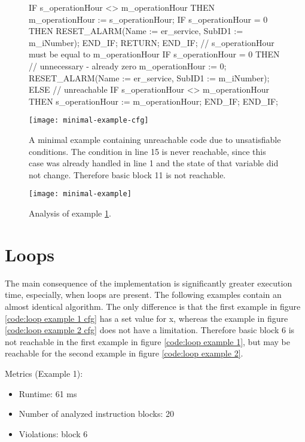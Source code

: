 \begin{figure}
	\begin{GenericCode}
IF s_operationHour <> m_operationHour THEN
	m_operationHour := s_operationHour;
	IF s_operationHour = 0 THEN
		RESET_ALARM(Name := er_service, SubID1 := m_iNumber);
	END_IF;
	RETURN;
END_IF;
// s_operationHour must be equal to m_operationHour
IF s_operationHour = 0 THEN
	// unnecessary - already zero
	m_operationHour := 0;
	RESET_ALARM(Name := er_service, SubID1 := m_iNumber);
ELSE
	// unreachable
	IF s_operationHour <> m_operationHour THEN
		s_operationHour := m_operationHour;
	END_IF;
END_IF;	\end{GenericCode}
	\centering

	\texttt{[image: minimal-example-cfg]}
	\caption{A minimal example containing unreachable code due to unsatisfiable conditions. The condition in line 15 is never reachable, since this case was already handled in line 1 and the state of that variable did not change. Therefore basic block 11 is not reachable.}
	\label{code:basic example 1 cfg}
\end{figure}

\begin{figure}
	\centering
	\texttt{[image: minimal-example]}
	\caption{Analysis of example \ref{code:basic example 1 cfg}. }
	\label{code:basic example 1}
\end{figure}

\section{Loops}
The main consequence of the implementation is significantly greater execution time, especially, when loops are present.
The following examples contain an almost identical algorithm. The only difference is that the first example in figure \ref{code:loop example 1 cfg} has a set value for x, whereas the example in figure \ref{code:loop example 2 cfg} does not have a limitation. Therefore basic block 6 is not reachable in the first example in figure \ref{code:loop example 1}, but may be reachable for the second example in figure \ref{code:loop example 2}.


Metrics (Example 1):
\begin{itemize}
	\item Runtime: 61 ms
	\item Number of analyzed instruction blocks: 20
	\item Violations: block 6
\end{itemize}



